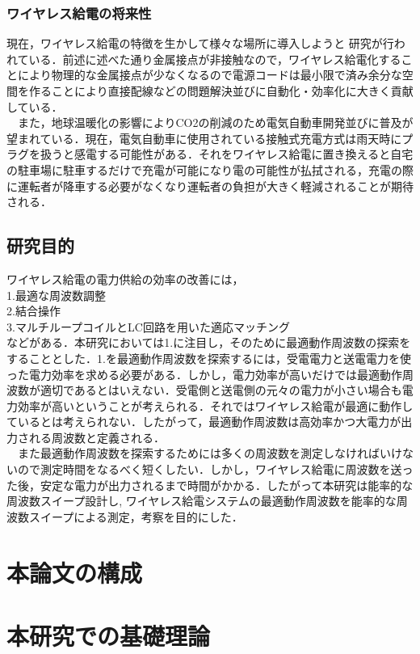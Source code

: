 \documentclass[12pt]{jarticle}
\begin{document}
\subsubsection{ワイヤレス給電の将来性}
現在，ワイヤレス給電の特徴を生かして様々な場所に導入しようと 研究が行われている．前述に述べた通り金属接点が非接触なので，ワイヤレス給電化することにより物理的な金属接点が少なくなるので電源コードは最小限で済み余分な空間を作ることにより直接配線などの問題解決並びに自動化・効率化に大きく貢献している\cite{syourai}\cite{matuda}．
\\　また，地球温暖化の影響によりCO{\tiny 2}の削減のため電気自動車開発並びに普及が望まれている．現在，電気自動車に使用されている接触式充電方式は雨天時にプラグを扱うと感電する可能性がある．それをワイヤレス給電に置き換えると自宅の駐車場に駐車するだけで充電が可能になり電の可能性が払拭される，充電の際に運転者が降車する必要がなくなり運転者の負担が大きく軽減されることが期待される．\cite{hakugin}
\clearpage
\subsection{研究目的}
ワイヤレス給電の電力供給の効率の改善には，
\\1.最適な周波数調整
\\2.結合操作
\\3.マルチループコイルとLC回路を用いた適応マッチング
\\などがある\cite{morita}．本研究においては1.に注目し，そのために最適動作周波数の探索をすることとした．1.を最適動作周波数を探索するには，受電電力と送電電力を使った電力効率を求める必要がある．しかし，電力効率が高いだけでは最適動作周波数が適切であるとはいえない．受電側と送電側の元々の電力が小さい場合も電力効率が高いということが考えられる．それではワイヤレス給電が最適に動作しているとは考えられない．したがって，最適動作周波数は高効率かつ大電力が出力される周波数と定義される．
\\　また最適動作周波数を探索するためには多くの周波数を測定しなければいけないので測定時間をなるべく短くしたい．しかし，ワイヤレス給電に周波数を送った後，安定な電力が出力されるまで時間がかかる．したがって本研究は能率的な周波数スイープ設計し,
ワイヤレス給電システムの最適動作周波数を能率的な周波数スイープによる測定，考察を目的にした．
\clearpage
\section{本論文の構成}

\clearpage
\section{本研究での基礎理論}
\end{document}
